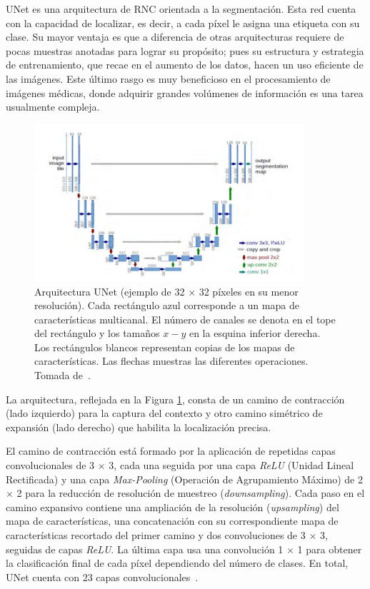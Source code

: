 UNet es una arquitectura de RNC orientada a la segmentación. Esta red cuenta con la capacidad de localizar, es decir, a cada píxel le asigna una etiqueta con su clase. Su mayor ventaja es que a diferencia de otras arquitecturas requiere de pocas muestras anotadas para lograr su propósito; pues su estructura y estrategia de entrenamiento, que recae en el aumento de los datos, hacen un uso eficiente de las imágenes. Este último rasgo es muy beneficioso en el procesamiento de imágenes médicas, donde adquirir grandes volúmenes de información es una tarea usualmente compleja.

\begin{figure}[ht]
	\centering
	\includegraphics[width=10cm]{./Graphics/unet.png}
	\caption{Arquitectura UNet (ejemplo de 32 $\times$ 32 píxeles en su menor resolución). Cada rectángulo azul corresponde a un mapa de características multicanal. El número de canales se denota en el tope del rectángulo y los tamaños $x-y$ en la esquina inferior derecha. Los rectángulos blancos representan copias de los mapas de características. Las flechas muestras las diferentes operaciones. Tomada de~\cite{ronneberger2015u}.}
	\label{fig:unet}
\end{figure}

La arquitectura, reflejada en la Figura \ref{fig:unet}, consta de un camino de contracción (lado izquierdo) para la captura del contexto y otro camino simétrico de expansión (lado derecho) que habilita la localización precisa.

El camino de contracción está formado por la aplicación de repetidas capas convolucionales de 3 $\times$ 3, cada una seguida por una capa \textit{ReLU} (Unidad Lineal Rectificada) y una capa \textit{Max-Pooling} (Operación de Agrupamiento Máximo) de 2 $\times$ 2 para la reducción de resolución de muestreo (\textit{downsampling}). Cada paso en el camino expansivo contiene una ampliación de la resolución (\textit{upsampling}) del mapa de características, una concatenación con su correspondiente mapa de características recortado del primer camino y dos convoluciones de 3 $\times$ 3, seguidas de capas \textit{ReLU}. La última capa usa una convolución 1 $\times$ 1 para obtener la clasificación final de cada píxel dependiendo del número de clases. En total, UNet cuenta con 23 capas convolucionales~\cite{ronneberger2015u}.

